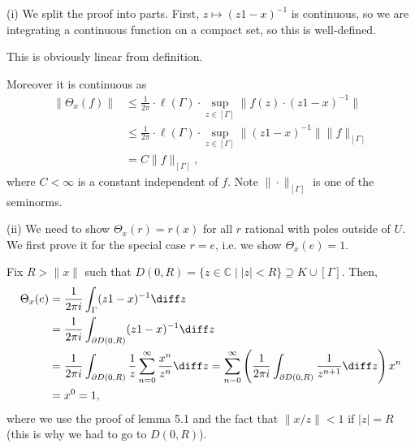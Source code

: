 \documentclass[12pt]{article}
\begin{document}
\begin{proofbox}
	

	(i) We split the proof into parts. First, $z \mapsto (z1 - x)^{-1}$ is continuous, so we are integrating a continuous function on a compact set, so this is well-defined.

	This is obviously linear from definition.

	Moreover it is continuous as
	\begin{align*}
		\|\Theta_x(f)\| &\leq \frac1 {2\pi} \cdot \ell(\Gamma) \cdot \sup_{z \in [\Gamma]} \|f(z) \cdot (z1 - x)^{-1}\| \\
				&\leq \frac{1}{2\pi} \cdot \ell(\Gamma) \cdot \sup_{z \in [\Gamma]} \|(z1 - x)^{-1}\| \|f\|_{[\Gamma]} \\
				&= C \|f\|_{[\Gamma]},
	\end{align*}
	where $C < \infty$ is a constant independent of $f$. Note $\|\cdot\|_{[\Gamma]}$ is one of the seminorms.

	(ii) We need to show $\Theta_x(r) = r(x)$ for all $r$ rational with poles outside of $U$. We first prove it for the special case $r = e$, i.e. we show $\Theta_x(e) = 1$.

	Fix $R > \|x\|$ such that $D(0, R) = \{z \in \mathbb{C} \mid |z| < R\} \supseteq K \cup [\Gamma]$. Then,
	\begin{align*}
		\Theta_x(e) &= \frac 1{2\pi i} \int_\Gamma (z1 - x)^{-1} \diff z \\
			    &= \frac 1 {2 \pi i} \int_{\partial D(0, R)} (z1 - x)^{-1} \diff z \\
			    &= \frac 1 {2\pi i} \int_{\partial D(0, R)} \frac 1z \sum_{n = 0}^{\infty} \frac{x^{n}}{z^{n}} \diff z = \sum_{n - 0}^{\infty} \left( \frac 1 {2 \pi i} \int_{\partial D(0, R)} \frac{1}{z^{n+1}} \diff z \right) x^{n} \\
			    &= x^0 = 1,
	\end{align*}
	where we use the proof of lemma 5.1 and the fact that $\|x/z\| < 1$ if $|z| = R$ (this is why we had to go to $D(0, R)$).


\end{proofbox}
\end{document}
